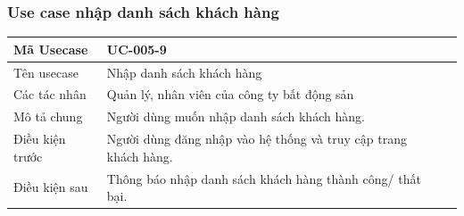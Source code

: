 \documentclass[12pt,a4paper]{article}
\begin{document}
    \subsubsection*{Use case nhập danh sách khách hàng}
    \begin{table}[H]
        \centering
        \begin{tabular}{|p{3.5cm}|p{11.5cm}|c|}
            \hline
            Mã Usecase      & UC-005-9                                                        \\
            \hline
            Tên usecase     & Nhập danh sách khách hàng                                       \\
            \hline
            Các tác nhân    & Quản lý, nhân viên của công ty bất động sản                     \\
            \hline
            Mô tả chung     & Người dùng muốn nhập danh sách khách hàng.                      \\
            \hline

            Điều kiện trước & Người dùng đăng nhập vào hệ thống và truy cập trang khách hàng. \\
            \hline

            Điều kiện sau   & Thông báo nhập danh sách khách hàng thành công/ thất bại.       \\
            \hline


\end{tabular}
\end{table}
\end{document}
